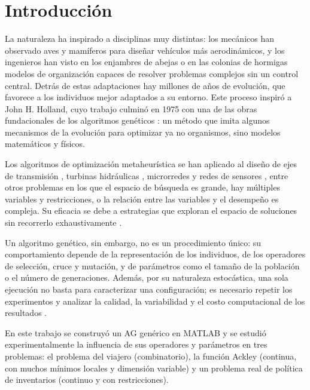 \documentclass[conference]{IEEEtran}
\begin{document}
\section{Introducci\'on}
La naturaleza ha inspirado a disciplinas muy distintas: los mec\'anicos han observado aves y mam\'iferos para dise\~nar veh\'iculos m\'as aerodin\'amicos, y los ingenieros han visto en los enjambres de abejas o en las colonias de hormigas modelos de organizaci\'on capaces de resolver problemas complejos sin un control central. Detr\'as de estas adaptaciones hay millones de a\~nos de evoluci\'on, que favorece a los individuos mejor adaptados a su entorno. Este proceso inspir\'o a John H. Holland, cuyo trabajo culmin\'o en 1975 con una de las obras fundacionales de los algoritmos gen\'eticos \cite{holland}: un m\'etodo que imita algunos mecanismos de la evoluci\'on para optimizar ya no organismos, sino modelos matem\'aticos y f\'isicos.

Los algoritmos de optimizaci\'on metaheur\'istica se han aplicado al dise\~no de ejes de transmisi\'on \cite{ejes}, turbinas hidr\'aulicas \cite{turbina1,turbina2}, microrredes \cite{montoya,grisales} y redes de sensores \cite{sensores}, entre otros problemas en los que el espacio de b\'usqueda es grande, hay m\'ultiples variables y restricciones, o la relaci\'on entre las variables y el desempe\~no es compleja. Su eficacia se debe a estrategias que exploran el espacio de soluciones sin recorrerlo exhaustivamente \cite{boussaid}.

Un algoritmo gen\'etico, sin embargo, no es un procedimiento \'unico: su comportamiento depende de la representaci\'on de los individuos, de los operadores de selecci\'on, cruce y mutaci\'on, y de par\'ametros como el tama\~no de la poblaci\'on o el n\'umero de generaciones. Adem\'as, por su naturaleza estoc\'astica, una sola ejecuci\'on no basta para caracterizar una configuraci\'on; es necesario repetir los experimentos y analizar la calidad, la variabilidad y el costo computacional de los resultados \cite{latorre}.

En este trabajo se construy\'o un AG gen\'erico en MATLAB y se estudi\'o experimentalmente la influencia de sus operadores y par\'ametros en tres problemas: el problema del viajero (combinatorio), la funci\'on Ackley (continua, con muchos m\'inimos locales y dimensi\'on variable) y un problema real de pol\'itica de inventarios (continuo y con restricciones).

\end{document}
